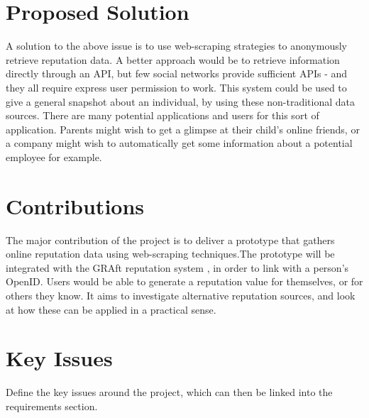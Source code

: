\section{Proposed Solution}
A solution to the above issue is to use web-scraping strategies to anonymously retrieve reputation data. A better approach would be to retrieve information directly through an API, but few social networks provide sufficient APIs - and they all require express user permission to work. This system could be used to give a general snapshot about an individual, by using these non-traditional data sources. There are many potential applications and users for this sort of application. Parents might wish to get a glimpse at their child's online friends, or a company might wish to automatically get some information about a potential employee for example.

\section{Contributions}
The major contribution of the project is to deliver a prototype that gathers online reputation data using web-scraping techniques.The prototype will be integrated with the GRAft reputation system \cite{graft_paper}, in order to link with a person's OpenID\cite{open_id}. Users would be able to generate a reputation value for themselves, or for others they know. 
It aims to investigate alternative reputation sources, and look at how these can be applied in a practical sense. 

\section{Key Issues}

Define the key issues around the project, which can then be linked into the requirements section.